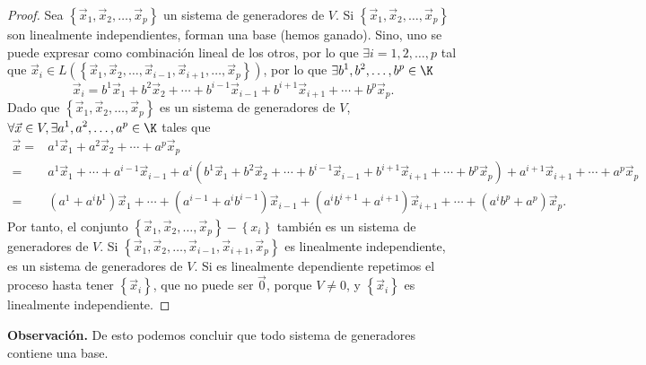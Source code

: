\begin{proof}
	Sea $\displaystyle \left\{ \vec{x}_{1}, \vec{x}_{2}, \ldots, \vec{x}_{p}\right\}  $ un sistema de generadores de $\displaystyle V $. Si $\displaystyle \left\{ \vec{x}_{1}, \vec{x}_{2}, \ldots, \vec{x}_{p}\right\} $ son linealmente independientes, forman una base (hemos ganado). Sino, uno se puede expresar como combinación lineal de los otros, por lo que $\displaystyle \exists i = 1, 2, \ldots, p $ tal que $\displaystyle \vec{x}_{i} \in L \left(\left\{ \vec{x}_{1}, \vec{x}_{2}, \ldots, \vec{x}_{i-1}, \vec{x}_{i+1}, \ldots, \vec{x}_{p}\right\}\right) $, por lo que $\displaystyle \exists b^{1}, b^{2}, \ldots, b^{p} \in \K $ 
	\[\vec{x}_{i} = b^{1}\vec{x}_{1} + b^{2}\vec{x}_{2} + \cdots + b^{i-1}\vec{x}_{i-1} +b^{i+1}\vec{x}_{i+1} + \cdots + b^{p}\vec{x}_{p}  .\]
Dado que $\displaystyle \left\{ \vec{x}_{1}, \vec{x}_{2}, \ldots, \vec{x}_{p}\right\} $ es un sistema de generadores de $\displaystyle V $, $\displaystyle \forall \vec{x}\in V, \exists a^{1}, a^{2}, \ldots, a^{p} \in \K $ tales que 
\[
\begin{split}
	\vec{x}  = & a^{1}\vec{x}_{1} + a^{2}\vec{x}_{2} + \cdots + a^{p}\vec{x}_{p}  \\
	= & a^{1}\vec{x}_{1} + \cdots + a^{i-1}\vec{x}_{i-1} + a^{i} \left(b^{1}\vec{x}_{1} + b^{2}\vec{x}_{2} + \cdots + b^{i-1}\vec{x}_{i-1} +b^{i+1}\vec{x}_{i+1} + \cdots + b^{p}\vec{x}_{p}\right)+a^{i+1}\vec{x}_{i+1} + \cdots + a^{p}\vec{x}_{p} \\
	= & \left(a^{1} + a^{i}b^{1}\right) \vec{x}_{1} + \cdots + \left(a^{i-1} + a^{i}b^{i-1}\right) \vec{x}_{i-1} + \left(a^{i}b^{i+1}+a^{i+1}\right)\vec{x}_{i+1}+\cdots+\left(a^{i}b^{p}+a^{p}\right)\vec{x}_{p}.
\end{split}
\]
Por tanto, el conjunto $\displaystyle \left\{ \vec{x}_{1}, \vec{x}_{2}, \ldots, \vec{x}_{p}\right\}- \left\{ x_{i}\right\}  $ también es un sistema de generadores de $\displaystyle V $. Si $\displaystyle \left\{ \vec{x}_{1}, \vec{x}_{2}, \ldots, \vec{x}_{i-1}, \vec{x}_{i+1}, \vec{x}_{p}\right\}  $ es linealmente independiente, es un sistema de generadores de $\displaystyle V $. Si es linealmente dependiente repetimos el proceso hasta tener $\displaystyle \left\{ \vec{x}_{i}\right\}  $, que no puede ser $\displaystyle \vec{0} $, porque $\displaystyle V \neq 0 $, y $\displaystyle \left\{ \vec{x}_{i}\right\}  $ es linealmente independiente.
\end{proof}

\textbf{Observación.} De esto podemos concluir que todo sistema de generadores contiene una base.

